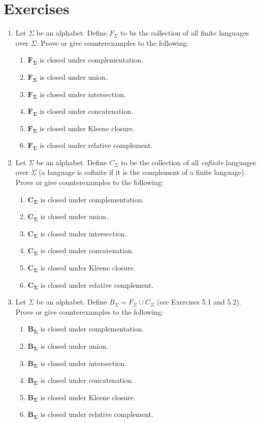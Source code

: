\section*{Exercises}

\begin{enumerate}[{5.}1. ]
\item Let $\Sigma$ be an alphabet. Define $F_\Sigma$ to be the collection of all
finite languages over $\Sigma$. Prove or give counterexamples to the following:
\begin{enumerate}
\item $\pmb{F_\Sigma}$ is closed under complementation.
\item $\pmb{F_\Sigma}$ is closed under union.
\item $\pmb{F_\Sigma}$ is closed under intersection.
\item $\pmb{F_\Sigma}$ is closed under concatenation.
\item $\pmb{F_\Sigma}$ is closed under Kleene closure.
\item $\pmb{F_\Sigma}$ is closed under relative complement.
\end{enumerate}

\item Let $\Sigma$ be an alphabet. Define $C_\Sigma$ to be the collection of all
 \emph{cofinite} languages over $\Sigma$ (a language is cofinite if it is the complement
of a finite language). Prove or give counterexamples to the following:
\begin{enumerate}
\item $\pmb{C_\Sigma}$ is closed under complementation.
\item $\pmb{C_\Sigma}$ is closed under union.
\item $\pmb{C_\Sigma}$ is closed under intersection.
\item $\pmb{C_\Sigma}$ is closed under concatenation.
\item $\pmb{C_\Sigma}$ is closed under Kleene closure.
\item $\pmb{C_\Sigma}$ is closed under relative complement.
\end{enumerate}

\item Let $\Sigma$ be an alphabet. Define $B_\Sigma = F_\Sigma \cup C_\Sigma$
(see Exercises 5.1 and 5.2). Prove or give counterexamples to the following:
\begin{enumerate}
\item $\pmb{B_\Sigma}$ is closed under complementation.
\item $\pmb{B_\Sigma}$ is closed under union.
\item $\pmb{B_\Sigma}$ is closed under intersection.
\item $\pmb{B_\Sigma}$ is closed under concatenation.
\item $\pmb{B_\Sigma}$ is closed under Kleene closure.
\item $\pmb{B_\Sigma}$ is closed under relative complement.
\end{enumerate}


\end{enumerate}
